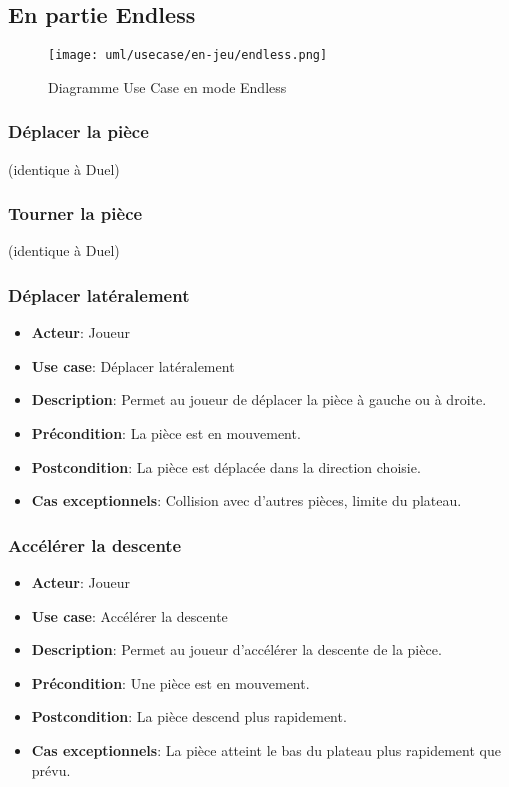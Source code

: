 \documentclass{article}
\begin{document}
\subsection{En partie Endless}

\begin{figure}
    \centering
    \texttt{[image: uml/usecase/en-jeu/endless.png]}
    \caption{Diagramme Use Case en mode Endless}
    \label{fig:Endless}
\end{figure}

\subsubsection{Déplacer la pièce} (identique à Duel)
\subsubsection{Tourner la pièce} (identique à Duel)

\subsubsection{Déplacer latéralement}
\begin{itemize}
    \item \textbf{Acteur}: Joueur
    \item \textbf{Use case}: Déplacer latéralement
    \item \textbf{Description}: Permet au joueur de déplacer la pièce à gauche ou à droite.
    \item \textbf{Précondition}: La pièce est en mouvement.
    \item \textbf{Postcondition}: La pièce est déplacée dans la direction choisie.
    \item \textbf{Cas exceptionnels}: Collision avec d'autres pièces, limite du plateau.
\end{itemize}

\subsubsection{Accélérer la descente}
\begin{itemize}
    \item \textbf{Acteur}: Joueur
    \item \textbf{Use case}: Accélérer la descente
    \item \textbf{Description}: Permet au joueur d'accélérer la descente de la pièce.
    \item \textbf{Précondition}: Une pièce est en mouvement.
    \item \textbf{Postcondition}: La pièce descend plus rapidement.
    \item \textbf{Cas exceptionnels}: La pièce atteint le bas du plateau plus rapidement que prévu.
\end{itemize}
\end{document}

